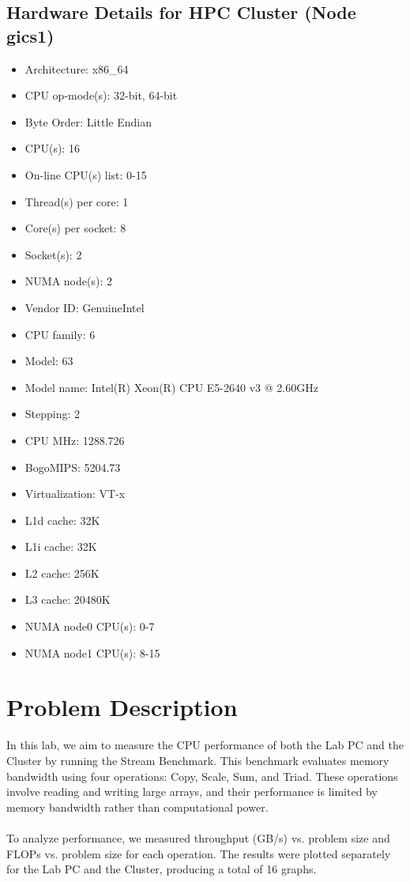 \documentclass[article, 11pt]{article}
\begin{document}
\subsection{Hardware Details for HPC Cluster (Node gics1)}
\begin{itemize}
    \item Architecture:          x86\_64
\item CPU op-mode(s):        32-bit, 64-bit
\item Byte Order:            Little Endian
\item CPU(s):                16
\item On-line CPU(s) list:   0-15
\item Thread(s) per core:    1
\item Core(s) per socket:    8
\item Socket(s):             2
\item NUMA node(s):          2
\item Vendor ID:             GenuineIntel
\item CPU family:            6
\item Model:                 63
\item Model name:            Intel(R) Xeon(R) CPU E5-2640 v3 @ 2.60GHz
\item Stepping:              2
\item CPU MHz:               1288.726
\item BogoMIPS:              5204.73
\item Virtualization:        VT-x
\item L1d cache:             32K
\item L1i cache:             32K
\item L2 cache:              256K
\item L3 cache:              20480K
\item NUMA node0 CPU(s):     0-7
\item NUMA node1 CPU(s):     8-15

\end{itemize}

\section{Problem Description}
In this lab, we aim to measure the CPU performance of both the Lab PC and the Cluster by running the Stream Benchmark. This benchmark evaluates memory bandwidth using four operations: Copy, Scale, Sum, and Triad. These operations involve reading and writing large arrays, and their performance is limited by memory bandwidth rather than computational power.\\ \\
To analyze performance, we measured throughput (GB/s) vs. problem size and FLOPs vs. problem size for each operation. The results were plotted separately for the Lab PC and the Cluster, producing a total of 16 graphs.
\end{document}
